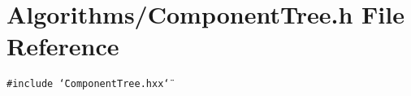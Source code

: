 \section{Algorithms/Component\-Tree.h File Reference}
\label{ComponentTree_8h}
{\tt \#include \char`\"{}Component\-Tree.hxx\char`\"{}}\par
